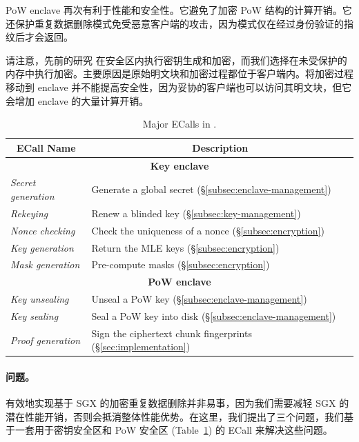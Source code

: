 PoW enclave 再次有利于性能和安全性。它避免了加密 PoW 结构的计算开销。它还保护重复数据删除模式免受恶意客户端的攻击，因为模式仅在经过身份验证的指纹后才会返回。

请注意，先前的研究 \cite{kim19,fuhry20,djoko19} 在安全区内执行密钥生成和加密，而我们选择在未受保护的内存中执行加密。主要原因是原始明文块和加密过程都位于客户端内。将加密过程移动到 enclave 并不能提高安全性，因为妥协的客户端也可以访问其明文块，但它会增加 enclave 的大量计算开销。

\begin{table}[t]
\small
\centering
\begin{tabular}{|l|l|}
\hline
\multicolumn{1}{|c|}{\bf ECall Name} & \multicolumn{1}{c|}{\bf Description}\\ 
\hline
\hline
\multicolumn{2}{|c|}{\bf Key enclave} \\
\hline
{\em Secret generation} & Generate a global secret 
(\S\ref{subsec:enclave-management}) \\
\hline
{\em Rekeying} & Renew a blinded key 
(\S\ref{subsec:key-management}) \\
\hline
{\em Nonce checking} & Check the uniqueness of a nonce 
(\S\ref{subsec:encryption}) \\
\hline
{\em Key generation} & Return the MLE keys (\S\ref{subsec:encryption}) \\
\hline
{\em Mask generation} & Pre-compute masks (\S\ref{subsec:encryption}) \\
\hline
\multicolumn{2}{|c|}{\bf PoW enclave} \\
\hline
  {\em Key unsealing} & Unseal a PoW key (\S\ref{subsec:enclave-management}) \\
\hline
  {\em Key sealing} & Seal a PoW key into disk (\S\ref{subsec:enclave-management})
\\
\hline
{\em Proof generation} & Sign the ciphertext chunk fingerprints 
(\S\ref{sec:implementation}) \\
\hline
\end{tabular}
\vspace{-6pt}
\caption{Major ECalls in \sysname.}
\label{tab:ecall}
\vspace{-3pt}
\end{table}


\paragraph{问题。} 有效地​​实现基于 SGX 的加密重复数据删除并非易事，因为我们需要减轻 SGX 的潜在性能开销，否则会抵消整体性能优势。在这里，我们提出了三个问题，我们基于一套用于密钥安全区和 PoW 安全区 (Table~\ref{tab:ecall}) 的 ECall 来解决这些问题。

